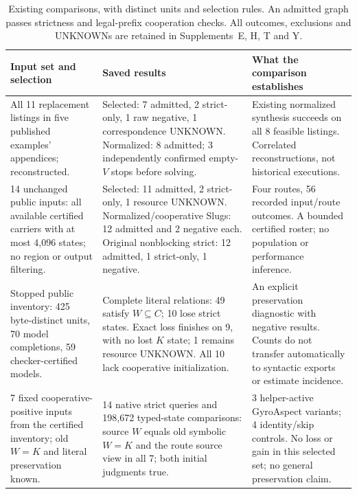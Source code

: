\begin{table}[t]
\centering\small
\caption{Existing comparisons, with distinct units and selection rules.
An admitted graph passes strictness and legal-prefix cooperation checks.
All outcomes, exclusions and UNKNOWNs are retained in Supplements~E, H, T and Y.}
\label{tab:comparison-summary}
\begin{tabular}{@{}L{43mm}L{78mm}L{43mm}@{}}\toprule
Input set and selection & Saved results & What the comparison establishes\\\midrule
All 11 replacement listings in five published examples' appendices;
reconstructed. &
Selected: 7 admitted, 2 strict-only, 1 raw negative,
1 correspondence UNKNOWN. Normalized: 8 admitted; 3 independently
confirmed empty-$V$ stops before solving. &
Existing normalized synthesis succeeds on all 8 feasible listings.
Correlated reconstructions, not historical executions.\\[4pt]
14 unchanged public inputs: all available certified carriers with at most
4,096 states; no region or output filtering. &
Selected: 11 admitted, 2 strict-only, 1 resource UNKNOWN.
Normalized/cooperative Slugs: 12 admitted and 2 negative each.
Original nonblocking strict: 12 admitted, 1 strict-only, 1 negative. &
Four routes, 56 recorded input/route outcomes. A bounded certified roster;
no population or performance inference.\\[4pt]
Stopped public inventory: 425 byte-distinct units, 70 model completions,
59 checker-certified models. &
Complete literal relations: 49 satisfy $W\subseteq C$; 10 lose strict
states. Exact loss finishes on 9, with no lost $K$ state; 1 remains
resource UNKNOWN. All 10 lack cooperative initialization. &
An explicit preservation diagnostic with negative results. Counts do not
transfer automatically to syntactic exports or estimate incidence.\\[4pt]
7 fixed cooperative-positive inputs~\cite{fixedsevennative2026} from the certified inventory;
old $W=K$ and literal preservation known. &
14 native strict queries and 198,672 typed-state comparisons: source $W$
equals old symbolic $W=K$
and the route source view in all 7; both initial judgments true. &
3 helper-active GyroAspect variants; 4 identity/skip controls.
No loss or gain in this selected set; no general preservation claim.\\\bottomrule
\end{tabular}
\end{table}
